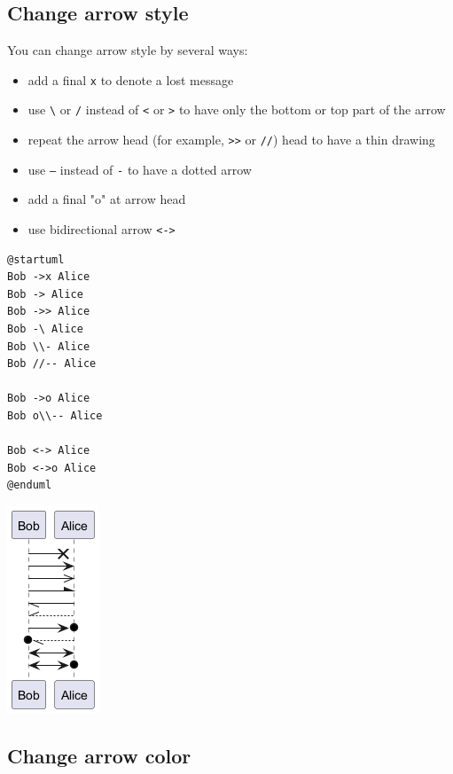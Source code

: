\subsection{Change arrow style}


You can change arrow style by several ways:
\begin{itemize}
\item add a final \texttt{x} to denote a lost message
\item use \texttt{\textbackslash} or \texttt{/} instead of \texttt{<} or \texttt{>} to have only the bottom or top part of the arrow
\item repeat the arrow head (for example, \texttt{>>} or \texttt{//}) head to have a thin drawing
\item use \texttt{--} instead of \texttt{-} to have a dotted arrow
\item add a final "o" at arrow head
\item use bidirectional arrow \texttt{<->}
\end{itemize}


\begin{verbatim}
@startuml
Bob ->x Alice
Bob -> Alice
Bob ->> Alice
Bob -\ Alice
Bob \\- Alice
Bob //-- Alice

Bob ->o Alice
Bob o\\-- Alice

Bob <-> Alice
Bob <->o Alice
@enduml
\end{verbatim}
\begin{center}
\includegraphics[scale=0.60]{imgw/img-7a5cf483763182898a9e0e6a62a39a7f.png}
\end{center}


%
%
\subsection{Change arrow color}


